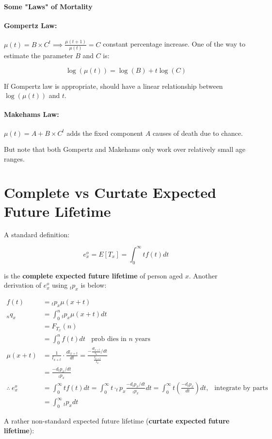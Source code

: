 \documentclass[a4paper, 11pt, twoside]{article}
\begin{document}
\textbf{Some "Laws" of Mortality}

\paragraph{Gompertz Law:} $\mu(t)=B\times C^t\implies \frac{\mu(t+1)}{\mu(t)}=C$ constant percentage increase. One of the way to estimate the parameter $B$ and $C$ is:

\[\log(\mu(t))=\log(B)+t\log(C)\]

If Gompertz law is appropriate, should have a linear relationship between $\log(\mu(t))$ and $t$.

\paragraph{Makehams Law:} $\mu(t)=A+B\times C^t$ adds the fixed component $A$ causes of death due to chance.

But note that both Gompertz and Makehams only work over relatively small age ranges.

\section{Complete vs Curtate Expected Future Lifetime}

A standard definition:

\[e^o_x=E[T_x]=\int^\infty_0tf(t)dt\]

is the \textbf{complete expected future lifetime} of person aged $x$. Another derivation of $e^o_x$ using ${}_tp_x$ is below:

\[
\begin{split}
	f(t)&={}_tp_x\mu(x+t)\\
	{}_nq_x&=\int^n_0{}_tp_x\mu(x+t)dt\\
	&=F_{T_x}(n)\\
	&=\int^n_0f(t)dt\ \ \ \ \text{prob dies in $n$ years}\\
	\mu(x+t)&=\frac{1}{l_{x+t}}\cdot\frac{dl_{x+t}}{dt}=\frac{-\frac{dl_{x+t}}{l_x}/dt}{\frac{l_{x+t}}{l_x}}\\
	&=\frac{-d_tp_x/dt}{{}_tp_x}\\
	\therefore\ e^o_x&=\int^\infty_0tf(t)dt=\int^\infty_0t\cdot_tp_x\frac{-d_tp_x/dt}{{}_tp_x}dt=\int^\infty_0t\left(\frac{-d_tp_x	}{dt}\right)dt,\ \ \text{ integrate by parts}\\
	&=\int^\infty_0{}_tp_xdt
\end{split}
\]

A rather non-standard expected future lifetime (\textbf{curtate expected future lifetime}):
\end{document}
